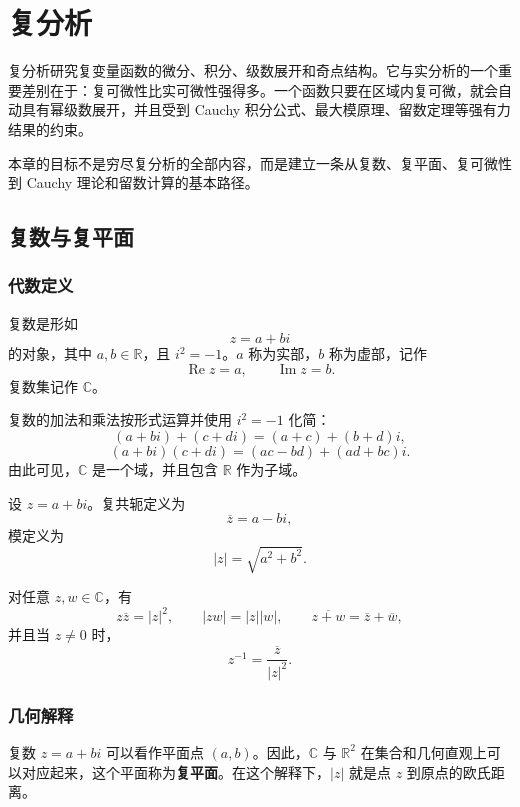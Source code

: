 \chapter{复分析}

复分析研究复变量函数的微分、积分、级数展开和奇点结构。它与实分析的一个重要差别在于：复可微性比实可微性强得多。一个函数只要在区域内复可微，就会自动具有幂级数展开，并且受到 Cauchy 积分公式、最大模原理、留数定理等强有力结果的约束。

本章的目标不是穷尽复分析的全部内容，而是建立一条从复数、复平面、复可微性到 Cauchy 理论和留数计算的基本路径。

\section{复数与复平面}

\subsection{代数定义}

\begin{definition}[复数]
复数是形如
\[
    z=a+bi
\]
的对象，其中 $a,b\in\mathbb{R}$，且 $i^2=-1$。$a$ 称为实部，$b$ 称为虚部，记作
\[
    \operatorname{Re}z=a,
    \qquad
    \operatorname{Im}z=b.
\]
复数集记作 $\mathbb{C}$。
\end{definition}

复数的加法和乘法按形式运算并使用 $i^2=-1$ 化简：
\[
    (a+bi)+(c+di)=(a+c)+(b+d)i,
\]
\[
    (a+bi)(c+di)=(ac-bd)+(ad+bc)i.
\]
由此可见，$\mathbb{C}$ 是一个域，并且包含 $\mathbb{R}$ 作为子域。

\begin{definition}[共轭与模]
设 $z=a+bi$。复共轭定义为
\[
    \overline{z}=a-bi,
\]
模定义为
\[
    |z|=\sqrt{a^2+b^2}.
\]
\end{definition}

\begin{proposition}[基本恒等式]
对任意 $z,w\in\mathbb{C}$，有
\[
    z\overline z=|z|^2,
    \qquad
    |zw|=|z||w|,
    \qquad
    \overline{z+w}=\overline z+\overline w,
\]
并且当 $z\ne0$ 时，
\[
    z^{-1}=\frac{\overline z}{|z|^2}.
\]
\end{proposition}

\subsection{几何解释}

复数 $z=a+bi$ 可以看作平面点 $(a,b)$。因此，$\mathbb{C}$ 与 $\mathbb{R}^2$ 在集合和几何直观上可以对应起来，这个平面称为\textbf{复平面}。在这个解释下，$|z|$ 就是点 $z$ 到原点的欧氏距离。

